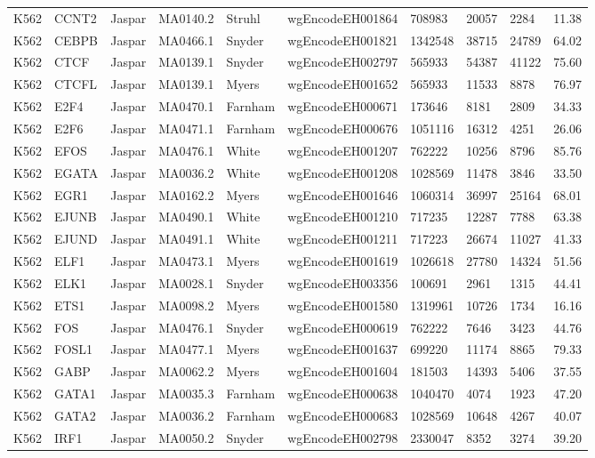{\begin{longtable}{p{1.1cm}p{1.0cm}p{1.0cm}p{1.0cm}p{1.0cm}p{2.3cm}p{1.0cm}p{0.8cm}p{0.8cm}p{0.8cm}}
K562 & CCNT2 & Jaspar & MA0140.2 & Struhl & wgEncodeEH001864 & 708983 & 20057 & 2284 & 11.38\\
K562 & CEBPB & Jaspar & MA0466.1 & Snyder & wgEncodeEH001821 & 1342548 & 38715 & 24789 & 64.02\\
K562 & CTCF & Jaspar & MA0139.1 & Snyder & wgEncodeEH002797 & 565933 & 54387 & 41122 & 75.60\\
K562 & CTCFL & Jaspar & MA0139.1 & Myers & wgEncodeEH001652 & 565933 & 11533 & 8878 & 76.97\\
K562 & E2F4 & Jaspar & MA0470.1 & Farnham & wgEncodeEH000671 & 173646 & 8181 & 2809 & 34.33\\
K562 & E2F6 & Jaspar & MA0471.1 & Farnham & wgEncodeEH000676 & 1051116 & 16312 & 4251 & 26.06\\
K562 & EFOS & Jaspar & MA0476.1 & White & wgEncodeEH001207 & 762222 & 10256 & 8796 & 85.76\\
K562 & EGATA & Jaspar & MA0036.2 & White & wgEncodeEH001208 & 1028569 & 11478 & 3846 & 33.50\\
K562 & EGR1 & Jaspar & MA0162.2 & Myers & wgEncodeEH001646 & 1060314 & 36997 & 25164 & 68.01\\
K562 & EJUNB & Jaspar & MA0490.1 & White & wgEncodeEH001210 & 717235 & 12287 & 7788 & 63.38\\
K562 & EJUND & Jaspar & MA0491.1 & White & wgEncodeEH001211 & 717223 & 26674 & 11027 & 41.33\\
K562 & ELF1 & Jaspar & MA0473.1 & Myers & wgEncodeEH001619 & 1026618 & 27780 & 14324 & 51.56\\
K562 & ELK1 & Jaspar & MA0028.1 & Snyder & wgEncodeEH003356 & 100691 & 2961 & 1315 & 44.41\\
K562 & ETS1 & Jaspar & MA0098.2 & Myers & wgEncodeEH001580 & 1319961 & 10726 & 1734 & 16.16\\
K562 & FOS & Jaspar & MA0476.1 & Snyder & wgEncodeEH000619 & 762222 & 7646 & 3423 & 44.76\\
K562 & FOSL1 & Jaspar & MA0477.1 & Myers & wgEncodeEH001637 & 699220 & 11174 & 8865 & 79.33\\
K562 & GABP & Jaspar & MA0062.2 & Myers & wgEncodeEH001604 & 181503 & 14393 & 5406 & 37.55\\
K562 & GATA1 & Jaspar & MA0035.3 & Farnham & wgEncodeEH000638 & 1040470 & 4074 & 1923 & 47.20\\
K562 & GATA2 & Jaspar & MA0036.2 & Farnham & wgEncodeEH000683 & 1028569 & 10648 & 4267 & 40.07\\
K562 & IRF1 & Jaspar & MA0050.2 & Snyder & wgEncodeEH002798 & 2330047 & 8352 & 3274 & 39.20\\

\end{longtable}}

